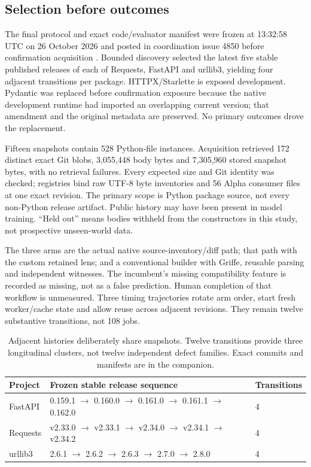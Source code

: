 \documentclass[11pt,letterpaper]{article}
\begin{document}
\subsection{Selection before outcomes}
The final protocol and exact code/evaluator manifest were frozen at 13:32:58 UTC on 26 October 2026 and posted in coordination issue 4850 before confirmation acquisition \cite{freeze}. Bounded discovery selected the latest five stable published releases of each of Requests, FastAPI and urllib3, yielding four adjacent transitions per package. HTTPX/Starlette is exposed development. Pydantic was replaced before confirmation exposure because the native development runtime had imported an overlapping current version; that amendment and the original metadata are preserved. No primary outcomes drove the replacement.

Fifteen snapshots contain 528 Python-file instances. Acquisition retrieved 172 distinct exact Git blobs, 3,055,448 body bytes and 7,305,960 stored snapshot bytes, with no retrieval failures. Every expected size and Git identity was checked; registries bind raw UTF-8 byte inventories and 56 Alpha consumer files at one exact revision. The primary scope is Python package source, not every non-Python release artifact. Public history may have been present in model training. ``Held out'' means bodies withheld from the constructors in this study, not prospective unseen-world data.

The three arms are the actual native source-inventory/diff path; that path with the custom retained lens; and a conventional builder with Griffe, reusable parsing and independent witnesses. The incumbent's missing compatibility feature is recorded as missing, not as a false prediction. Human completion of that workflow is unmeasured. Three timing trajectories rotate arm order, start fresh worker/cache state and allow reuse across adjacent revisions. They remain twelve substantive transitions, not 108 jobs.

\begin{table}[H]\small
\begin{tabularx}{\textwidth}{@{}p{1.05in}Yp{.7in}@{}}\toprule
Project & Frozen stable release sequence & Transitions\\\midrule
FastAPI & 0.159.1 $\to$ 0.160.0 $\to$ 0.161.0 $\to$ 0.161.1 $\to$ 0.162.0 & 4\\
Requests & v2.33.0 $\to$ v2.33.1 $\to$ v2.34.0 $\to$ v2.34.1 $\to$ v2.34.2 & 4\\
urllib3 & 2.6.1 $\to$ 2.6.2 $\to$ 2.6.3 $\to$ 2.7.0 $\to$ 2.8.0 & 4\\\bottomrule
\end{tabularx}
\caption{Adjacent histories deliberately share snapshots. Twelve transitions provide three longitudinal clusters, not twelve independent defect families. Exact commits and manifests are in the companion.}
\end{table}
\end{document}
